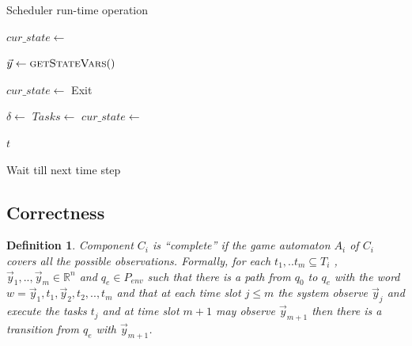 \documentclass[ twoside, 12pt ]{article}
\newcommand\R{{\mathbb R}}
\newtheorem{dfn}{Definition} %
\begin{document}
\begin{algorithm}[!h]
    \caption{Scheduler run-time operation}
    \begin{algorithmic}[1]
         
            \State {} 
            \State $cur\_state \gets$  
            
            \Statex
            \Loop 
                \State $\vec{y} \gets \Call{getStateVars}$
                
                \State $cur\_state \gets$  
                    \State Exit 
                \EndIf
                
                \Statex
                \State $\delta \gets$  
                \State $Tasks \gets$ 
                \State $cur\_state \gets$ 
                
                 
                    \State {} {$t$}
                \EndFor
                
                \Statex
                \State Wait till next time step
                
            \EndLoop
        \EndProcedure
    \end{algorithmic}
    \label{code:scheduler}
\end{algorithm}

\subsection{Correctness}

\begin{dfn}
    Component $C_i$ is ``complete'' if the game automaton $A_i$ of $C_i$ covers all the possible observations. Formally, for each $t_1, .. t_m \subseteq T_i$ , $\vec{y}_1, .. , \vec{y}_m \in \R^n$ and $q_e \in P_{env}$ such that there is a path from $q_0$ to $q_e$ with the word $w= \vec{y}_1 , t_1 , \vec{y}_2 , t_2, .. , t_m$ and that at each time slot $j \le m$ the system observe $\vec{y}_j$ and execute the tasks $t_j$ and at time slot $m+1$ may observe $\vec{y}_{m+1}$ then there is a transition from $q_e$ with $\vec{y}_{m+1}$.
\end{dfn}
\end{document}
